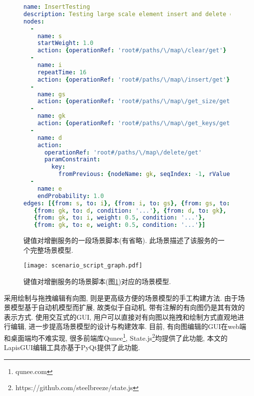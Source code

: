         \begin{figure}[!htb]
            \centering
            \scriptsize
            \tt
            
            \begin{lstlisting}[language=yaml]
name: InsertTesting
description: Testing large scale element insert and delete operations
nodes:
  -
    name: s
    startWeight: 1.0
    action: {operationRef: 'root#/paths/\/map\/clear/get'}
  -
    name: i
    repeatTime: 16
    action: {operationRef: 'root#/paths/\/map\/insert/get'}
  -
    name: gs
    action: {operationRef: 'root#/paths/\/map\/get_size/get'}
  -
    name: gk
    action: {operationRef: 'root#/paths/\/map\/get_keys/get'}
  -
    name: d
    action:
      operationRef: 'root#/paths/\/map\/delete/get'
      paramConstraint:
        key:
          fromPrevious: {nodeName: gk, seqIndex: -1, rValue: '$response.body#/keys/0'}
  -
    name: e
    endProbability: 1.0
edges: [{from: s, to: i}, {from: i, to: gs}, {from: gs, to: gk},
   {from: gk, to: d, condition: '...'}, {from: d, to: gk},
   {from: gk, to: i, weight: 0.5, condition: '...'},
   {from: gk, to: e, weight: 0.5, condition: '...'}]
            \end{lstlisting}
            
            \caption{键值对增删服务的一段场景脚本(有省略). 此场景描述了该服务的一个完整场景模型.}
            \label{fig:scenario_script_eg}
        \end{figure}
        
        \begin{figure}[!htb]
            \centering
            \texttt{[image: scenario\_script\_graph.pdf]}
            \caption{键值对增删服务的场景脚本(图\ref{fig:scenario_script_eg})对应的场景模型.}
            \label{fig:scenario_script_graph}
        \end{figure}
        
        采用绘制与拖拽编辑有向图, 则是更高级方便的场景模型的手工构建方法. 由于场景模型基于自动机模型而扩展, 故类似于自动机, 带有注解的有向图仍是其有效的表示方式. 使用交互式的GUI, 用户可以直接对有向图以拖拽和绘制方式直观地进行编辑, 进一步提高场景模型的设计与构建效率. 目前, 有向图编辑的GUI在web端和桌面端均不难实现, 很多前端库Qunee\footnote{qunee.com}, State.js\footnote{https://github.com/steelbreeze/state.js}均提供了此功能, 本文的LapisGUI编辑工具亦基于PyQt提供了此功能.
        
